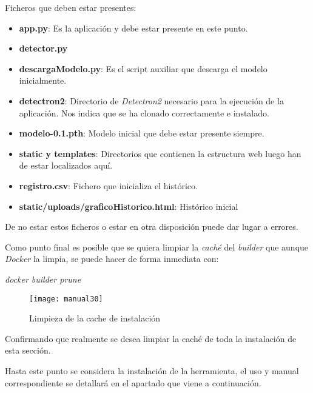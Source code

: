 \begin{enumerate}
    Ficheros que deben estar presentes:
    
    \begin{itemize}
        \item \textbf{app.py}: Es la aplicación y debe estar presente en este punto.
        \item \textbf{detector.py}
        \item\textbf{descargaModelo.py}: Es el script auxiliar que descarga el modelo inicialmente.
        \item\textbf{detectron2}: Directorio de \emph{Detectron2} necesario para la ejecución de la aplicación. Nos indica que se ha clonado correctamente e instalado.
        \item\textbf{modelo-0.1.pth}: Modelo inicial que debe estar presente siempre.
        \item\textbf{static y templates}: Directorios que contienen la estructura web luego han de estar localizados aquí.
        \item\textbf{registro.csv}: Fichero que inicializa el histórico.
        \item\textbf{static/uploads/graficoHistorico.html}: Histórico inicial
    \end{itemize}  
    
    De no estar estos ficheros o estar en otra disposición puede dar lugar a errores.
    
\end{enumerate}

Como punto final es posible que se quiera limpiar la \emph{caché} del \emph{builder} que aunque \emph{Docker} la limpia, se puede hacer de forma inmediata con: \\
\begin{center}\emph{docker builder prune}\end{center}

    \begin{figure}[htb]
	\centering
	\texttt{[image: manual30]}
	\caption[Limpieza de la cache de instalación]{Limpieza de la cache de instalación}
    \end{figure}
    
Confirmando que realmente se desea limpiar la caché de toda la instalación de esta sección.

Hasta este punto se considera la instalación de la herramienta, el uso y manual correspondiente se detallará en el apartado que viene a continuación.

\clearpage

